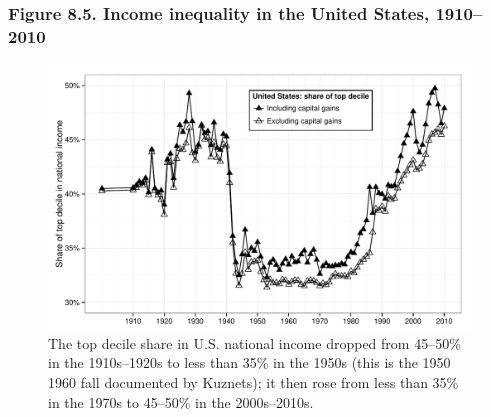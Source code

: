 \documentclass[t]{beamer}\usepackage[]{graphicx}\usepackage[]{color}
\newenvironment{knitrout}{}{} %
\begin{document}
\begin{frame}[label=Figure_8_5,fragile]
\frametitle{Figure 8.5. Income inequality in the United States, 1910--2010}
\begin{figure}[t]
\begin{minipage}[b]{\textwidth}
\centering
\begin{knitrout}\footnotesize
{}\color{fgcolor}

{\centering \includegraphics[width=1\linewidth]{figures/bw/Figure_8_5} 

}



\end{knitrout}
\caption{The top decile share in U.S. national income dropped from 45--50\% in the 1910s--1920s to less than 35\% in the 1950s (this is the
1950 1960 fall documented by Kuznets); it then rose from less than 35\% in the 1970s to 45--50\% in the 2000s--2010s.}
\end{minipage}
\end{figure}
\end{frame}
\end{document}
